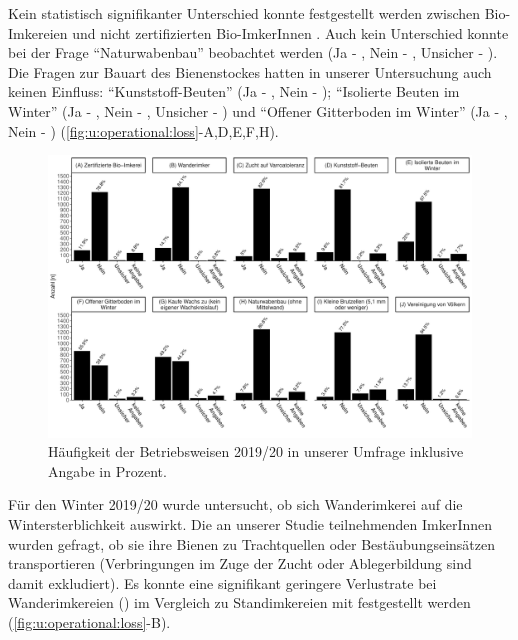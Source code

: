 Kein statistisch signifikanter Unterschied konnte festgestellt werden zwischen Bio-Imkereien  und nicht zertifizierten Bio-ImkerInnen . Auch kein Unterschied konnte bei der Frage \enquote{Naturwabenbau} beobachtet werden (Ja - , Nein - , Unsicher - ). Die Fragen zur Bauart des Bienenstockes hatten in unserer Untersuchung auch keinen Einfluss: \enquote{Kunststoff-Beuten} (Ja - , Nein - ); \enquote{Isolierte Beuten im Winter} (Ja - , Nein - , Unsicher - ) und \enquote{Offener Gitterboden im Winter} (Ja - , Nein - ) (\cref{fig:u:operational:loss}-A,D,E,F,H).

\begin{figure}[H]
  \centering
  \includegraphics[keepaspectratio,width=1\textwidth]{project-U-wintersterblichkeit/figures/plot_operational_hist}
  \caption{Häufigkeit der Betriebsweisen 2019/20 in unserer Umfrage inklusive Angabe in Prozent.}
  \label{fig:u:operational:hist}
\end{figure}

\label{ss:stand_wander:U}

Für den Winter 2019/20 wurde untersucht, ob sich Wanderimkerei auf die Wintersterblichkeit auswirkt. Die an unserer Studie teilnehmenden ImkerInnen wurden gefragt, ob sie ihre Bienen zu Trachtquellen oder Bestäubungseinsätzen transportieren (Verbringungen im Zuge der Zucht oder Ablegerbildung sind damit exkludiert).
\newline
Es konnte eine signifikant geringere Verlustrate bei Wanderimkereien () im Vergleich zu Standimkereien mit  festgestellt werden (\cref{fig:u:operational:loss}-B). 

